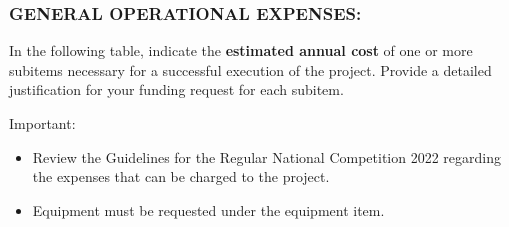 \newpage

\subsubsection*{\uppercase{General operational expenses:}}

In the following table, indicate the \textbf{estimated annual cost} of one or more subitems necessary for a successful execution of the project. Provide a detailed justification for your funding request for each subitem.

\medskip

\noindent Important:
\begin{itemize}[nosep]
\item Review the Guidelines for the Regular National Competition 2022 regarding the expenses that can be charged to the project.
\item Equipment must be requested under the equipment item.
\end{itemize}

